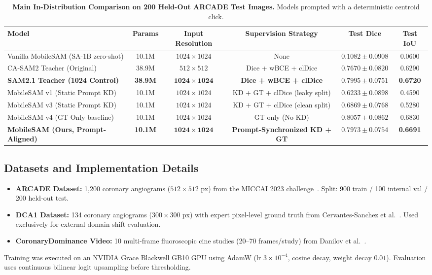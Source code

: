 \documentclass[10pt,twocolumn]{article}
\begin{document}
\begin{table}[t]
\centering
\footnotesize
\setlength{\tabcolsep}{4.5pt}
\caption{\textbf{Main In-Distribution Comparison on 200 Held-Out ARCADE Test Images.} Models prompted with a deterministic centroid click.}
\label{tab:arcade}
\begin{tabular}{lccccc}
\toprule
\textbf{Model} & \textbf{Params} & \textbf{Input Resolution} & \textbf{Supervision Strategy} & \textbf{Test Dice} & \textbf{Test IoU} \\
\midrule
Vanilla MobileSAM (SA-1B zero-shot) & 10.1M & $1024\times 1024$ & None & $0.1082 \pm 0.0908$ & 0.0600 \\
CA-SAM2 Teacher (Original) & 38.9M & $512\times 512$ & Dice + wBCE + clDice & $0.7670 \pm 0.0820$ & 0.6290 \\
\textbf{SAM2.1 Teacher (1024 Control)} & \textbf{38.9M} & $\mathbf{1024\times 1024}$ & \textbf{Dice + wBCE + clDice} & $\mathbf{0.7995 \pm 0.0751}$ & \textbf{0.6720} \\
\midrule
MobileSAM v1 (Static Prompt KD) & 10.1M & $1024\times 1024$ & KD + GT + clDice (leaky split) & $0.6233 \pm 0.0898$ & 0.4590 \\
MobileSAM v3 (Static Prompt KD) & 10.1M & $1024\times 1024$ & KD + GT + clDice (clean split) & $0.6869 \pm 0.0768$ & 0.5280 \\
MobileSAM v4 (GT Only baseline) & 10.1M & $1024\times 1024$ & GT only (No KD) & $0.8057 \pm 0.0862$ & 0.6830 \\
\textbf{MobileSAM (Ours, Prompt-Aligned)} & \textbf{10.1M} & $\mathbf{1024\times 1024}$ & \textbf{Prompt-Synchronized KD + GT} & $\mathbf{0.7973 \pm 0.0754}$ & \textbf{0.6691} \\
\bottomrule
\end{tabular}
\end{table}

\subsection{Datasets and Implementation Details}
\begin{itemize}
    \item \textbf{ARCADE Dataset:} 1,200 coronary angiograms ($512\times 512$ px) from the MICCAI 2023 challenge~\citep{arcade}. Split: 900 train / 100 internal val / 200 held-out test.
    \item \textbf{DCA1 Dataset:} 134 coronary angiograms ($300\times 300$ px) with expert pixel-level ground truth from Cervantes-Sanchez et al.~\citep{dca1}. Used exclusively for external domain shift evaluation.
    \item \textbf{CoronaryDominance Video:} 10 multi-frame fluoroscopic cine studies (20--70 frames/study) from Danilov et al.~\citep{coronary_dominance}.
\end{itemize}
Training was executed on an NVIDIA Grace Blackwell GB10 GPU using AdamW (lr $3\times 10^{-4}$, cosine decay, weight decay $0.01$). Evaluation uses continuous bilinear logit upsampling before thresholding.
\end{document}
